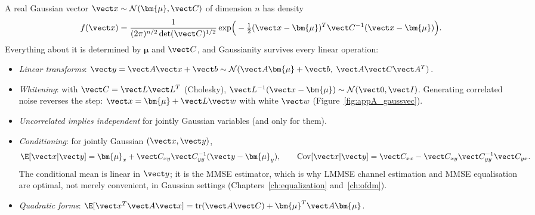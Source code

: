 A real Gaussian vector $\vect x\sim\mathcal N(\bm{\mu},\vect C)$ of dimension $n$ has density
\begin{equation}
f(\vect x)=\frac{1}{(2\pi)^{n/2}\det(\vect C)^{1/2}}\exp\!\Big(-\tfrac12(\vect x-\bm{\mu})^T\vect C^{-1}(\vect x-\bm{\mu})\Big).
\end{equation}
Everything about it is determined by $\bm{\mu}$ and $\vect C$, and Gaussianity survives every
linear operation:
\begin{itemize}[leftmargin=1.5em,itemsep=2pt]
\item \emph{Linear transforms}: $\vect y=\vect A\vect x+\vect b\sim\mathcal N(\vect A\bm{\mu}+\vect b,\;\vect A\vect C\vect A^T)$.
\item \emph{Whitening}: with $\vect C=\vect L\vect L^T$ (Cholesky), $\vect L^{-1}(\vect x-\bm{\mu})\sim\mathcal N(\vect0,\vect I)$.
Generating correlated noise reverses the step: $\vect x=\bm{\mu}+\vect L\vect w$ with white $\vect w$
(Figure~\ref{fig:appA_gaussvec}).
\item \emph{Uncorrelated implies independent} for jointly Gaussian variables (and only for them).
\item \emph{Conditioning}: for jointly Gaussian $(\vect x,\vect y)$,
\begin{equation}
\E[\vect x|\vect y]=\bm{\mu}_x+\vect C_{xy}\vect C_{yy}^{-1}(\vect y-\bm{\mu}_y),\qquad
\operatorname{Cov}[\vect x|\vect y]=\vect C_{xx}-\vect C_{xy}\vect C_{yy}^{-1}\vect C_{yx}.
\label{eq:appA:condgauss}
\end{equation}
The conditional mean is linear in $\vect y$; it is the MMSE estimator, which is why LMMSE channel
estimation and MMSE equalisation are optimal, not merely convenient, in Gaussian settings
(Chapters~\ref{ch:equalization} and~\ref{ch:ofdm}).
\item \emph{Quadratic forms}: $\E[\vect x^T\vect A\vect x]=\operatorname{tr}(\vect A\vect C)+\bm{\mu}^T\vect A\bm{\mu}$.
\end{itemize}


